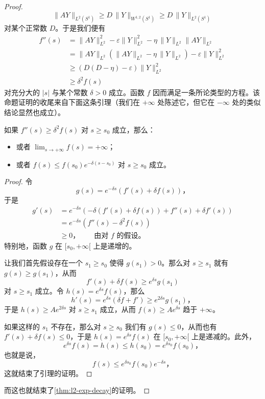 \begin{proof}
\[
\|AY\|_{L^{2}(S^{1})}\ge D\,\|Y\|_{W^{1,2}(S^{1})}\ge D\,\|Y\|_{L^{2}(S^{1})}
\]
对某个正常数 $D$。于是我们便有
\[
\begin{aligned}
f''(s)&=\|AY\|^{2}_{L^{2}}-\varepsilon\|Y\|^{2}_{L^{2}}-\eta\,\|Y\|_{L^{2}}\|AY\|_{L^{2}}\\
&=\|AY\|_{L^{2}}\left(\|AY\|_{L^{2}}-\eta\,\|Y\|_{L^{2}}\right)-\varepsilon\|Y\|^{2}_{L^{2}}\\
&\ge\left(D(D-\eta)-\varepsilon\right)\|Y\|^{2}_{L^{2}}\\
&\ge\delta^{2}f(s)
\end{aligned}
\]
对充分大的 $|s|$ 与某个常数 $\delta>0$ 成立。函数 $f$ 因而满足一条所论类型的\trDifferential{}方程。该命题证明的收尾来自下面这条引理（我们在 $+\infty$ 处陈述它，但它在 $-\infty$ 处的类似结论显然也成立）。

\begin{lemma}\label{thm:f-growth-dichotomy}
如果 $f''(s)\ge\delta^{2}f(s)$ 对 $s\ge s_{0}$ 成立，那么：
\begin{itemize}
\item 或者 $\lim_{s\to+\infty}f(s)=+\infty$；
\item 或者 $f(s)\le f(s_{0})e^{-\delta(s-s_{0})}$ 对 $s\ge s_{0}$ 成立。
\end{itemize}
\end{lemma}

\begin{proof}
令
\[
g(s)=e^{-\delta s}\left(f'(s)+\delta f(s)\right)\text{，}
\]
于是
\[
\begin{aligned}
g'(s)&=e^{-\delta s}\left(-\delta(f'(s)+\delta f(s))+f''(s)+\delta f'(s)\right)\\
&=e^{-\delta s}\left(f''(s)-\delta^{2}f(s)\right)\\
&\ge 0\text{，}\qquad\text{由对 }f\text{ 的假设。}
\end{aligned}
\]
特别地，函数 $g$ 在 $[s_{0},+\infty[$ 上是递增的。

让我们首先假设存在一个 $s_{1}\ge s_{0}$ 使得 $g(s_{1})>0$。那么对 $s\ge s_{1}$ 就有 $g(s)\ge g(s_{1})$，从而
\[
f'(s)+\delta f(s)\ge e^{\delta s}g(s_{1})
\]
对 $s\ge s_{1}$ 成立。令 $h(s)=e^{\delta s}f(s)$，那么
\[
h'(s)=e^{\delta s}(\delta f+f')\ge e^{2\delta s}g(s_{1})\text{，}
\]
于是 $h(s)\ge Ae^{2\delta s}$ 对 $s\ge s_{1}$ 成立，从而 $f(s)\ge Ae^{\delta s}$ 趋于 $+\infty$。

如果这样的 $s_{1}$ 不存在，那么对 $s\ge s_{0}$ 我们有 $g(s)\le 0$，从而也有 $f'(s)+\delta f(s)\le 0$，于是 $h(s)=e^{\delta s}f(s)$ 在 $[s_{0},+\infty[$ 上是递减的。此外，
\[
e^{\delta s}f(s)=h(s)\le h(s_{0})=e^{\delta s_{0}}f(s_{0})\text{，}
\]
也就是说，
\[
f(s)\le e^{\delta s_{0}}f(s_{0})e^{-\delta s}\text{，}
\]
这就结束了引理的证明。
\end{proof}

而这也就结束了\cref{thm:l2-exp-decay}的证明。
\end{proof}

